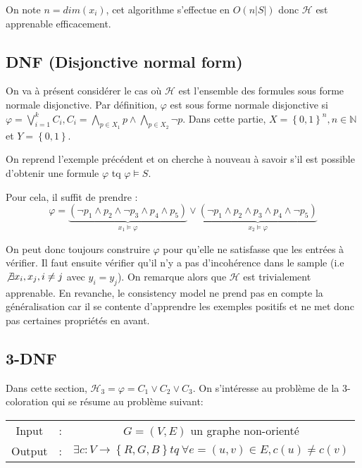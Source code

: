 \documentclass{article}
\begin{document}
    On note $n=dim(x_i)$, cet algorithme s'effectue en $O(n\lvert S \rvert)$ donc
    $\mathcal{H}$ est apprenable efficacement.

    \subsection{DNF (Disjonctive normal form)}
    On va à présent considérer le cas où $\mathcal{H}$ est l'ensemble des formules sous forme normale disjonctive. Par définition, $\varphi$ est sous forme
    normale disjonctive si $\varphi = \bigvee_{i=1}^k C_i, C_i = \bigwedge_{p\in X_1} p \wedge \bigwedge_{p\in X_2} \neg p$. Dans cette partie, $X = \left\{0,1 \right\}^n, n\in \mathbb{N}$ et $Y = \left\{0,1 \right\}$.

    On reprend l'exemple précédent et on cherche à nouveau à savoir s'il est possible d'obtenir une formule $\varphi$ tq $\varphi \models S$.

    Pour cela, il suffit de prendre :
    \begin{equation}
        \varphi = \underbrace{(\neg p_1 \wedge p_2 \wedge \neg p_3 \wedge p_4 \wedge p_5)}_{x_1 \models \varphi}
                \vee \underbrace{(\neg p_1 \wedge p_2 \wedge p_3 \wedge p_4 \wedge \neg p_5)}_{x_2 \models \varphi}
    \end{equation}

    On peut donc toujours construire $\varphi$ pour qu'elle ne satisfasse que
    les entrées à vérifier. Il faut ensuite vérifier qu'il n'y a pas d'incohérence
    dans le sample (i.e $\not \exists x_i, x_j, i \neq j$ avec $y_i = y_j$).
    On remarque alors que $\mathcal{H}$ est trivialement apprenable. En revanche,
    le consistency model ne prend pas en compte la généralisation car il se contente d'apprendre les exemples positifs et ne met donc pas certaines
    propriétés en avant.

    \subsection{3-DNF}
    Dans cette section, $\mathcal{H}_3 = {\varphi = C_1 \vee C_2 \vee C_3}$. On
    s'intéresse au problème de la 3-coloration qui se résume au problème suivant:
    \\

    \begin{tabular}{ccc}
    Input & : & $G = (V,E)$ un graphe non-orienté \\
    Output & : & $\exists c : V \rightarrow \left\{ R,G,B \right\} tq~ \forall e=(u,v)\in E, c(u) \neq c(v)$ \\
    \end{tabular}
    \\
\end{document}
